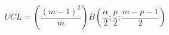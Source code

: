 

\[
UCL = \left( \frac{(m - 1)^2}{m} \right)
B \left( \frac{\alpha}{2}; \frac{p}{2}; \frac{m - p -1}{2} \right)
\]


